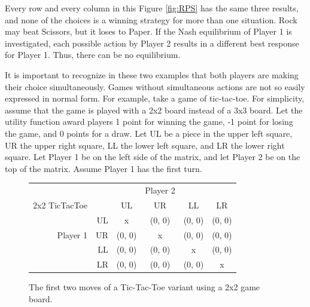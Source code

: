 Every row and every column in this Figure \ref{fig:RPS} has the same three results, and none of the choices is a winning strategy for more than one situation. Rock may beat Scissors, but it loses to Paper. If the Nash equilibrium of Player 1 is investigated, each possible action by Player 2 results in a different best response for Player 1. Thus, there can be no equilibrium.

It is important to recognize in these two examples that both players are making their choice simultaneously. Games without simultaneous actions are not so easily expressed in normal form. For example, take a game of tic-tac-toe. For simplicity, assume that the game is played with a 2x2 board instead of a 3x3 board. Let the utility function award players 1 point for winning the game, -1 point for losing the game, and 0 points for a draw. Let UL be a piece in the upper left square, UR the upper right square, LL the lower left square, and LR the lower right square. Let Player 1 be on the left side of the matrix, and let Player 2 be on the top of the matrix. Assume Player 1 has the first turn.\\
\begin{figure}[H]
  \centering
  \begin{tabular}{r r | c | c | c | c |}
    &\multicolumn{1}{c}{}&\multicolumn{1}{c}{}&\multicolumn{1}{c}{Player 2}&\multicolumn{1}{c}{}\\
    \multicolumn{1}{c}{2x2 TicTacToe}&\multicolumn{1}{c}{}&\multicolumn{1}{c}{UL}&
    \multicolumn{1}{c}{UR}&\multicolumn{1}{c}{LL}&\multicolumn{1}{c}{LR}\\ \cline{3-6}
    & UL & x & (0, 0) & (0, 0) & (0, 0) \\ \cline{3-6}
    Player 1 & UR & (0, 0) & x & (0, 0) & (0, 0) \\ \cline{3-6}
    & LL & (0, 0) & (0, 0) & x & (0, 0) \\ \cline{3-6}
    & LR & (0, 0) & (0, 0) & (0, 0) & x \\ \cline{3-6}
  \end{tabular}
  \caption{The first two moves of a Tic-Tac-Toe variant using a 2x2 game board.}
  \label{fig:2x2TTT}
\end{figure}

